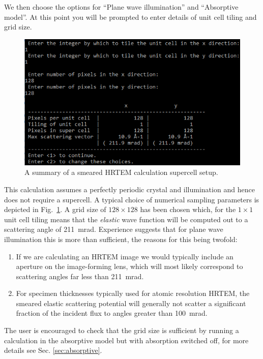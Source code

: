 \documentclass[12pt,a4paper]{article}
\begin{document}
We then choose the options for ``Plane wave illumination'' and ``Absorptive model''.
At this point you will be prompted to enter details of unit cell tiling and grid size.
%
\begin{figure}[!h]
\begin{center}
\includegraphics[scale=0.75]{figures/pw_abs_numerical.png}
\caption{A summary of a smeared HRTEM calculation supercell setup.}
\label{fig:pw_abs_numerical}
\end{center}
\end{figure}
%
This calculation assumes a perfectly periodic crystal and illumination and hence does not require a supercell.
A typical choice of numerical sampling parameters is depicted in Fig.~\ref{fig:pw_abs_numerical}.
A grid size of $128\times128$ has been chosen which, for the $1\times1$ unit cell tiling means that the \emph{elastic} wave function will be computed out to a scattering angle of 211~mrad. 
Experience suggests that for plane wave illumination this is more than sufficient, the reasons for this being twofold:
%
\begin{enumerate}
    \item{If we are calculating an HRTEM image we would typically include an aperture on the image-forming lens, which will most likely correspond to scattering angles far less than 211~mrad.}
    \item{For specimen thicknesses typically used for atomic resolution HRTEM, the smeared elastic scattering potential will generally not scatter a significant fraction of the incident flux to angles greater than 100~mrad.}
\end{enumerate}
%
The user is encouraged to check that the grid size is sufficient by running a calculation in the absorptive model but with absorption switched off, for more details see Sec. \ref{sec:absorptive}.
\end{document}
